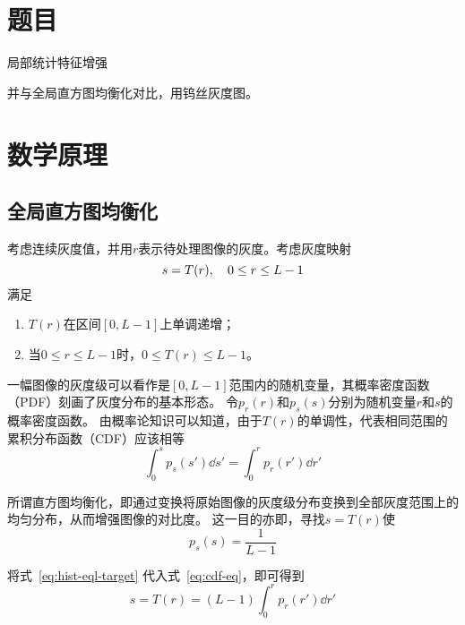 \documentclass{hitgsrep}
\begin{document}
\maketitle

\section{题目}

局部统计特征增强

并与全局直方图均衡化对比，用钨丝灰度图。

\section{数学原理}

\subsection{全局直方图均衡化}

考虑连续灰度值，并用$r$表示待处理图像的灰度。考虑灰度映射
\begin{equation}
    s=T(r)\qc{0\le r\le L-1}
\end{equation}
满足
\begin{enumerate}
    \item $T(r)$在区间$[0,L-1]$上单调递增；
    \item 当$0\le r\le L-1$时，$0\le T(r)\le L-1$。
\end{enumerate}

一幅图像的灰度级可以看作是$[0,L-1]$范围内的随机变量，其概率密度函数（PDF）刻画了灰度分布的基本形态。
令$p_r(r)$和$p_s(s)$分别为随机变量$r$和$s$的概率密度函数。
由概率论知识可以知道，由于$T(r)$的单调性，代表相同范围的累积分布函数（CDF）应该相等
\begin{equation}\label{eq:cdf-eq}
    \int_{0}^{s}p_s(s')\dd{s'}=\int_{0}^{r}p_r(r')\dd{r'}
\end{equation}

所谓直方图均衡化，即通过变换将原始图像的灰度级分布变换到全部灰度范围上的均匀分布，从而增强图像的对比度。
这一目的亦即，寻找$s=T(r)$使
\begin{equation}\label{eq:hist-eql-target}
    p_s(s)=\frac{1}{L-1}
\end{equation}

将式~\eqref{eq:hist-eql-target} 代入式~\eqref{eq:cdf-eq}，即可得到
\begin{equation}\label{eq:hist-eql-cont}
    s=T(r)=(L-1)\int_0^r p_r(r')\dd{r'}
\end{equation}
\end{document}
